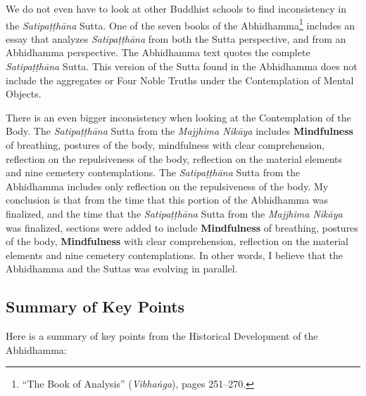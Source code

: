 We do not even have to look at other Buddhist schools to find inconsistency in the \textit{Satipaṭṭhāna} Sutta. One of the seven books of the Abhidhamma\footnote{“The Book of Analysis” (\textit{Vibhaṅga}), pages 251--270.} includes an essay that analyzes \textit{Satipaṭṭhāna} from both the Sutta perspective, and from an Abhidhamma perspective. The Abhidhamma text quotes the complete \textit{Satipaṭṭhāna} Sutta. This version of the Sutta found in the Abhidhamma does not include the aggregates or Four Noble Truths under the Contemplation of Mental Objects.

There is an even bigger inconsistency when looking at the Contemplation of the Body. The \textit{Satipaṭṭhāna} Sutta from the \textit{Majjhima Nikāya} includes \textbf{Mindfulness} of breathing, postures of the body, mindfulness with clear comprehension, reflection on the repulsiveness of the body, reflection on the material elements and nine cemetery contemplations. The \textit{Satipaṭṭhāna} Sutta from the Abhidhamma includes only reflection on the repulsiveness of the body. My conclusion is that from the time that this portion of the Abhidhamma was finalized, and the time that the \textit{Satipaṭṭhāna} Sutta from the \textit{Majjhima Nikāya} was finalized, sections were added to include \textbf{Mindfulness} of breathing, postures of the body, \textbf{Mindfulness} with clear comprehension, reflection on the material elements and nine cemetery contemplations. In other words, I believe that the Abhidhamma and the Suttas was evolving in parallel.

\subsection*{Summary of Key Points}

Here is a summary of key points from the Historical Development of the Abhidhamma:

